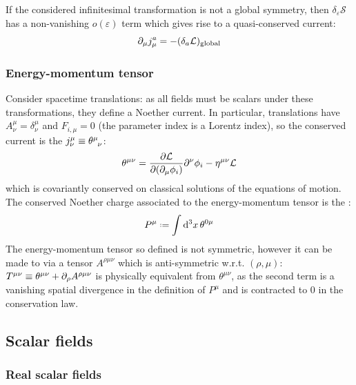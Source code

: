 If the considered infinitesimal transformation is not a global symmetry, then $ \delta_\varepsilon \mathcal{S} $ has a non-vanishing $ o(\varepsilon) $ term which gives rise to a quasi-conserved current:
\begin{equation}
  \partial_\mu j^a_\mu = - (\delta_a \mathcal{L})_\mathrm{global}
\end{equation}

\subsubsection{Energy-momentum tensor}

Consider spacetime translations: as all fields must be scalars under these transformations, they define a Noether current. In particular, translations have $ A^\mu_\nu = \delta^\mu_\nu $ and $ F_{i,\mu} = 0 $ (the parameter index is a Lorentz index), so the conserved current is the  $ j^\mu_\nu \equiv \tensor{\theta}{^\mu_\nu} $:
\begin{equation}
  \theta^{\mu \nu} = \frac{\partial \mathcal{L}}{\partial (\partial_\mu \phi_i)} \partial^\nu \phi_i - \eta^{\mu \nu} \mathcal{L}
  \label{eq:en-mom-tensor}
\end{equation}
which is covariantly conserved on classical solutions of the equations of motion. The conserved Noether charge associated to the energy-momentum tensor is the :
\begin{equation}
  P^\mu \defeq \int \dd^3 x\, \theta^{0 \mu}
  \label{eq:4-mom-def}
\end{equation}
The energy-momentum tensor so defined is not symmetric, however it can be made to via a tensor $ A^{\rho \mu \nu} $ which is anti-symmetric w.r.t. $ (\rho,\mu) $: $ T^{\mu \nu} \equiv \theta^{\mu \nu} + \partial_\rho A^{\rho \mu \nu} $ is physically equivalent from $ \theta^{\mu \nu} $, as the second term is a vanishing spatial divergence in the definition of $ P^\mu $ and is contracted to 0 in the conservation law.

\subsection{Scalar fields}

\subsubsection{Real scalar fields}

